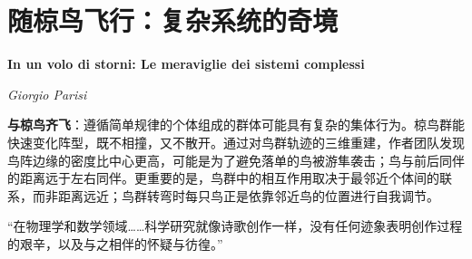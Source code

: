 \chapter{随椋鸟飞行：复杂系统的奇境}
\Large\textbf{In un volo di storni: Le meraviglie dei sistemi complessi}
\par \emph{Giorgio Parisi} \normalsize

\par \textbf{与椋鸟齐飞}：遵循简单规律的个体组成的群体可能具有复杂的集体行为。椋鸟群能快速变化阵型，既不相撞，又不散开。通过对鸟群轨迹的三维重建，作者团队发现鸟阵边缘的密度比中心更高，可能是为了避免落单的鸟被游隼袭击；鸟与前后同伴的距离远于左右同伴。更重要的是，鸟群中的相互作用取决于最邻近个体间的联系，而非距离远近；鸟群转弯时每只鸟正是依靠邻近鸟的位置进行自我调节。

“在物理学和数学领域……科学研究就像诗歌创作一样，没有任何迹象表明创作过程的艰辛，以及与之相伴的怀疑与彷徨。”
